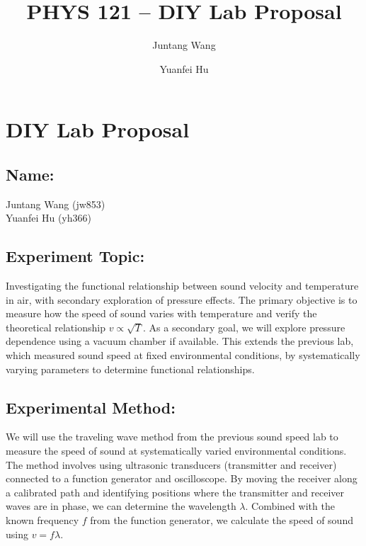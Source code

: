 \documentclass[12pt]{article}
\title{PHYS 121 -- DIY Lab Proposal}
\author{Juntang Wang \and Yuanfei Hu}
\date{}
\begin{document}
\maketitle

\section*{DIY Lab Proposal}

\subsection*{Name:}
Juntang Wang (jw853)\\
Yuanfei Hu (yh366)

\subsection*{Experiment Topic:}
Investigating the functional relationship between sound velocity and temperature in air, with secondary exploration of pressure effects. The primary objective is to measure how the speed of sound varies with temperature and verify the theoretical relationship $v \propto \sqrt{T}$. As a secondary goal, we will explore pressure dependence using a vacuum chamber if available. This extends the previous lab, which measured sound speed at fixed environmental conditions, by systematically varying parameters to determine functional relationships.

\subsection*{Experimental Method:}
We will use the traveling wave method from the previous sound speed lab to measure the speed of sound at systematically varied environmental conditions. The method involves using ultrasonic transducers (transmitter and receiver) connected to a function generator and oscilloscope. By moving the receiver along a calibrated path and identifying positions where the transmitter and receiver waves are in phase, we can determine the wavelength $\lambda$. Combined with the known frequency $f$ from the function generator, we calculate the speed of sound using $v = f\lambda$.
\end{document}
